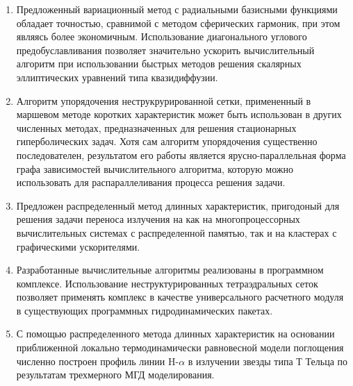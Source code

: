 \begin{enumerate}
  \item Предложенный вариационный метод с радиальными базисными функциями обладает точностью, сравнимой с методом сферических гармоник, при этом являясь более экономичным. Использование диагонального углового предобуславливания позволяет значительно ускорить вычислительный алгоритм при использовании быстрых методов решения скалярных эллиптических уравнений типа квазидиффузии.
  \item Алгоритм упорядочения неструкрурированной сетки, примененный в маршевом методе коротких характеристик может быть использован в других численных методах, предназначенных для решения стационарных гиперболических задач. Хотя сам алгоритм упорядочения существенно последователен, результатом его работы является ярусно-параллельная форма графа зависимостей вычислительного алгоритма, которую можно использовать для распараллеливания процесса решения задачи.
  \item Предложен распределенный метод длинных характеристик, пригодоный для решения задачи переноса излучения на как на многопроцессорных вычислительных системах с распределенной памятью, так и на кластерах с графическими ускорителями.
  \item Разработанные вычислительные алгоритмы реализованы в программном комплексе. Использование неструктурированных тетраэдральных сеток позволяет применять комплекс в качестве универсального расчетного модуля в существующих программных гидродинамических пакетах.
  \item С помощью распределенного метода длинных характеристик на основании приближенной локально термодинамически равновесной модели поглощения численно построен профиль линии H-$\alpha$ в излучении звезды типа Т Тельца по результатам трехмерного МГД моделирования.
\end{enumerate}
